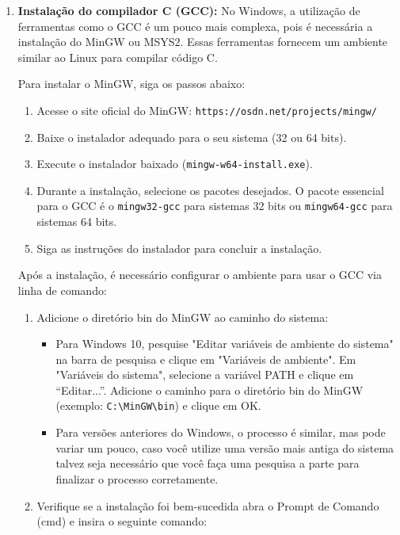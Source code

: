 \begin{enumerate}
    \item \textbf{Instalação do compilador C (GCC):} 
        No Windows, a utilização de ferramentas como o GCC é um pouco mais 
        complexa, pois é necessária a instalação do MinGW ou MSYS2. Essas 
        ferramentas fornecem um ambiente similar ao Linux para compilar 
        código C.

        Para instalar o MinGW, siga os passos abaixo:

        \begin{enumerate}
            \item Acesse o site oficial do MinGW: \texttt{https://osdn.net/projects/mingw/}
            \item Baixe o instalador adequado para o seu sistema (32 ou 64 bits).
            \item Execute o instalador baixado (\texttt{mingw-w64-install.exe}).
            \item Durante a instalação, selecione os pacotes desejados. O 
                pacote essencial para o GCC é o \texttt{mingw32-gcc} para 
                sistemas 32 bits ou \texttt{mingw64-gcc} para sistemas 64 bits.
            \item Siga as instruções do instalador para concluir a instalação.
        \end{enumerate}

        Após a instalação, é necessário configurar o ambiente para usar o GCC via linha de comando:

        \begin{enumerate}
            \item Adicione o diretório bin do MinGW ao caminho do sistema:
                \begin{itemize}
                        \renewcommand{\labelitemi}{\tiny$\blacksquare$}
                    \item Para Windows 10, pesquise "Editar variáveis de ambiente 
                        do sistema" na barra de pesquisa e clique em "Variáveis 
                        de ambiente". Em "Variáveis do sistema", selecione a 
                        variável PATH e clique em ``Editar...''. Adicione o caminho 
                        para o diretório bin do MinGW (exemplo: 
                        \texttt{C:\textbackslash MinGW\textbackslash bin}) e 
                        clique em OK.
                    \item Para versões anteriores do Windows, o processo é 
                        similar, mas pode variar um pouco, caso você utilize 
                        uma versão mais antiga do sistema talvez seja necessário 
                        que você faça uma pesquisa a parte para finalizar o 
                        processo corretamente.
                \end{itemize}
            \item Verifique se a instalação foi bem-sucedida abra o Prompt de Comando (cmd) 
                e insira o seguinte comando:


\end{enumerate}
\end{enumerate}
